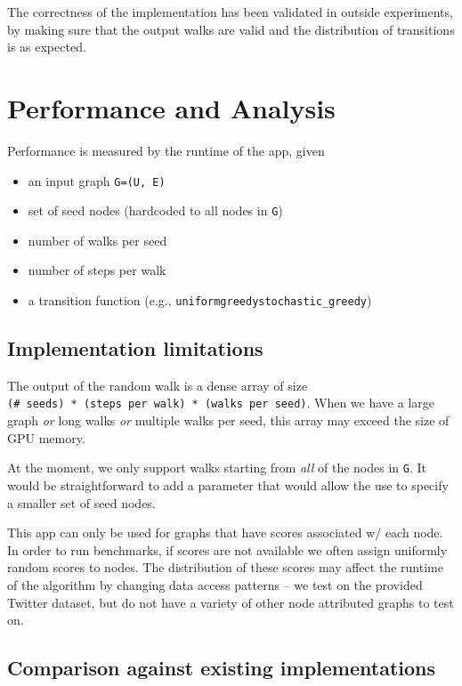 \documentclass[10pt,oneside]{memoir}
\providecommand{\tightlist}{%
  \setlength{\itemsep}{0pt}\setlength{\parskip}{0pt}}
\begin{document}
The correctness of the implementation has been validated in outside
experiments, by making sure that the output walks are valid and the
distribution of transitions is as expected.

\hypertarget{performance-and-analysis-3}{%
\section{Performance and Analysis}\label{performance-and-analysis-3}}

Performance is measured by the runtime of the app, given

\begin{itemize}
\tightlist
\item
  an input graph \texttt{G=(U,\ E)}
\item
  set of seed nodes (hardcoded to all nodes in \texttt{G})
\item
  number of walks per seed
\item
  number of steps per walk
\item
  a transition function (e.g.,
  \texttt{uniform\textbar{}greedy\textbar{}stochastic\_greedy})
\end{itemize}

\hypertarget{implementation-limitations-3}{%
\subsection{Implementation
limitations}\label{implementation-limitations-3}}

The output of the random walk is a dense array of size
\texttt{(\#\ seeds)\ *\ (steps\ per\ walk)\ *\ (walks\ per\ seed)}. When
we have a large graph \emph{or} long walks \emph{or} multiple walks per
seed, this array may exceed the size of GPU memory.

At the moment, we only support walks starting from \emph{all} of the
nodes in \texttt{G}. It would be straightforward to add a parameter that
would allow the use to specify a smaller set of seed nodes.

This app can only be used for graphs that have scores associated w/ each
node. In order to run benchmarks, if scores are not available we often
assign uniformly random scores to nodes. The distribution of these
scores may affect the runtime of the algorithm by changing data access
patterns -- we test on the provided Twitter dataset, but do not have a
variety of other node attributed graphs to test on.

\hypertarget{comparison-against-existing-implementations-3}{%
\subsection{Comparison against existing
implementations}\label{comparison-against-existing-implementations-3}}
\end{document}
